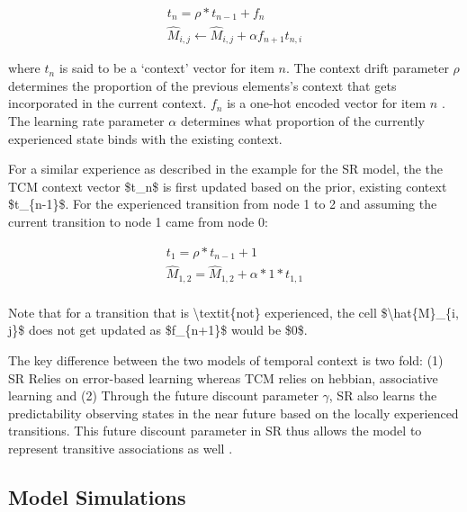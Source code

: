\begin{equation}
	\begin{aligned}
		t_n = \rho * t_{n-1} + f_n \\ 
		\hat{M}_{i, j} \leftarrow \hat{M}_{i, j} + \alpha f_{n+1} t_{n, i}			
	\end{aligned}
\end{equation}

where $t_n$ is said to be a `context' vector for item $n$. The context drift parameter $\rho$ determines the proportion of the previous elements's context that gets incorporated in the current context. $f_n$ is a one-hot encoded vector for item $n$ . The learning rate parameter $\alpha$ determines what proportion of the currently experienced state binds with the existing context. 

\ac{For a similar experience as described in the example for the SR model, the the TCM context vector $t_n$ is first updated based on the prior, existing context $t_{n-1}$. For the experienced transition from node 1 to 2 and assuming the current transition to node 1 came from node 0:}

\begin{equation}
	\begin{aligned}
		t_1 = \rho*t_{n-1} + 1  \\
		\hat{M}_{1, 2} = \hat{M}_{1, 2} + \alpha*1*t_{1,1} \\ 
	\end{aligned}
\end{equation}

\ac{Note that for a transition that is \textit{not} experienced, the cell $\hat{M}_{i, j}$ does not get updated as $f_{n+1}$ would be $0$.}

The key difference between the two models of temporal context is two fold: (1) SR Relies on error-based learning whereas TCM relies on hebbian, associative learning and (2) Through the future discount parameter $\gamma$, SR also learns the predictability observing states in the near future based on the locally experienced transitions. This future discount parameter in SR thus allows the model to represent transitive associations as well  \parencite{gershman2012successor}. 

\subsection{Model Simulations}

